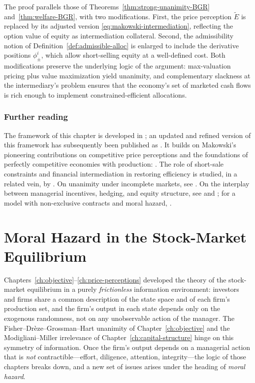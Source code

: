 \documentclass[11pt,a4paper,oneside]{book}
\theoremstyle{plain}
\theoremstyle{definition}
\theoremstyle{remark}
\numberwithin{equation}{chapter}
\begin{document}
The proof parallels those of Theorems~\ref{thm:strong-unanimity-BGR} and~\ref{thm:welfare-BGR}, with two modifications.
First, the price perception $\widetilde{E}$ is replaced by its adjusted version \eqref{eq:makowski-intermediation}, reflecting the option value of equity as intermediation collateral.
Second, the admissibility notion of Definition~\ref{def:admissible-alloc} is enlarged to include the derivative positions $\phi^i_\pm$, which allow short-selling equity at a well-defined cost.
Both modifications preserve the underlying logic of the argument: max-valuation pricing plus value maximization yield unanimity, and complementary slackness at the intermediary's problem ensures that the economy's set of marketed cash flows is rich enough to implement constrained-efficient allocations.

\subsection{Further reading}

The framework of this chapter is developed in \citet{BisinGottardiRuta2015}; an updated and refined version of this framework has subsequently been published as \citet{BisinClementiGottardi2025}.
It builds on Makowski's pioneering contributions on competitive price perceptions and the foundations of perfectly competitive economies with production: \citet{Makowski1980, Makowski1983a, Makowski1983b}.
The role of short-sale constraints and financial intermediation in restoring efficiency is studied, in a related vein, by \citet{AllenGale1991}.
On unanimity under incomplete markets, see \citet{CarcelesCoenPirani2009}.
On the interplay between managerial incentives, hedging, and equity structure, see \citet{AcharyaBisin2009} and \citet{BisinGottardiRampini2008}; for a model with non-exclusive contracts and moral hazard, \citet{BisinGuaitoli2004}.

\chapter{Moral Hazard in the Stock-Market Equilibrium}
\label{ch:moral-hazard}

Chapters~\ref{ch:objective}--\ref{ch:price-perceptions} developed the theory of the stock-market equilibrium in a purely \emph{frictionless} information environment: investors and firms share a common description of the state space and of each firm's production set, and the firm's output in each state depends only on the exogenous randomness, not on any unobservable action of the manager.
The Fisher--Drèze--Grossman--Hart unanimity of Chapter~\ref{ch:objective} and the Modigliani--Miller irrelevance of Chapter~\ref{ch:capital-structure} hinge on this symmetry of information.
Once the firm's output depends on a managerial action that is \emph{not} contractible---effort, diligence, attention, integrity---the logic of those chapters breaks down, and a new set of issues arises under the heading of \emph{moral hazard}.
\end{document}
